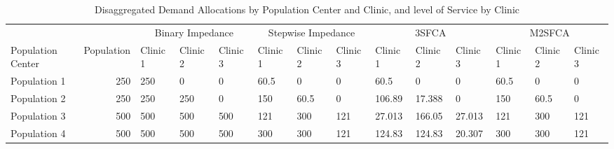 \documentclass[10pt,letterpaper]{article}
\begin{document}
\begin{landscape}\begin{table}[t]

\caption{\label{tab:table-simulation-demand}\label{tab:table-simulation-demand}Disaggregated Demand Allocations by Population Center and Clinic, and level of Service by Clinic}
\centering
\fontsize{7}{9}\selectfont
\begin{tabular}{lrllllllllllll}
\toprule
\multicolumn{2}{c}{ } & \multicolumn{3}{c}{Binary Impedance} & \multicolumn{3}{c}{Stepwise Impedance} & \multicolumn{3}{c}{3SFCA} & \multicolumn{3}{c}{M2SFCA} \\
\cmidrule(l{2pt}r{2pt}){3-5} \cmidrule(l{2pt}r{2pt}){6-8} \cmidrule(l{2pt}r{2pt}){9-11} \cmidrule(l{2pt}r{2pt}){12-14}
Population Center & Population & Clinic 1 & Clinic 2 & Clinic 3 & Clinic 1 & Clinic 2 & Clinic 3 & Clinic 1 & Clinic 2 & Clinic 3 & Clinic 1 & Clinic 2 & Clinic 3\\
\midrule
Population 1 & 250 & \textcolor[HTML]{0D0887}{250} & \textcolor[HTML]{FCCE25}{0} & \textcolor[HTML]{FCCE25}{0} & \textcolor[HTML]{EF7D50}{60.5} & \textcolor[HTML]{FCCE25}{0} & \textcolor[HTML]{FCCE25}{0} & \textcolor[HTML]{EF7D50}{60.5} & \textcolor[HTML]{FCCE25}{0} & \textcolor[HTML]{FCCE25}{0} & \textcolor[HTML]{EF7D50}{60.5} & \textcolor[HTML]{FCCE25}{0} & \textcolor[HTML]{FCCE25}{0}\\
Population 2 & 250 & \textcolor[HTML]{0D0887}{250} & \textcolor[HTML]{0D0887}{250} & \textcolor[HTML]{FCCE25}{0} & \textcolor[HTML]{A51F99}{150} & \textcolor[HTML]{EF7D50}{60.5} & \textcolor[HTML]{FCCE25}{0} & \textcolor[HTML]{CE4B75}{106.89} & \textcolor[HTML]{FDB42F}{17.388} & \textcolor[HTML]{FCCE25}{0} & \textcolor[HTML]{A51F99}{150} & \textcolor[HTML]{EF7D50}{60.5} & \textcolor[HTML]{FCCE25}{0}\\
Population 3 & 500 & \textcolor[HTML]{0D0887}{500} & \textcolor[HTML]{0D0887}{500} & \textcolor[HTML]{0D0887}{500} & \textcolor[HTML]{F58A47}{121} & \textcolor[HTML]{AB2494}{300} & \textcolor[HTML]{F58A47}{121} & \textcolor[HTML]{FCCE25}{27.013} & \textcolor[HTML]{E76F5A}{166.05} & \textcolor[HTML]{FCCE25}{27.013} & \textcolor[HTML]{F58A47}{121} & \textcolor[HTML]{AB2494}{300} & \textcolor[HTML]{F58A47}{121}\\
Population 4 & 500 & \textcolor[HTML]{0D0887}{500} & \textcolor[HTML]{0D0887}{500} & \textcolor[HTML]{0D0887}{500} & \textcolor[HTML]{A92296}{300} & \textcolor[HTML]{A92296}{300} & \textcolor[HTML]{F3874A}{121} & \textcolor[HTML]{F2844B}{124.83} & \textcolor[HTML]{F2844B}{124.83} & \textcolor[HTML]{FCCE25}{20.307} & \textcolor[HTML]{A92296}{300} & \textcolor[HTML]{A92296}{300} & \textcolor[HTML]{F3874A}{121}\\

\end{tabular}
\end{table}
\end{landscape}
\end{document}
